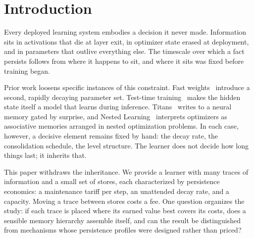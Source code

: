 \documentclass[11pt]{article}
\begin{document}
\section{Introduction}
\label{sec:intro}

Every deployed learning system embodies a decision it never made. Information sits in activations that
die at layer exit, in optimizer state erased at deployment, and in parameters that outlive everything
else. The timescale over which a fact persists follows from where it happens to sit, and where it sits
was fixed before training began.

Prior work loosens specific instances of this constraint. Fast weights~\citep{hinton1987fast,
ba2016using} introduce a second, rapidly decaying parameter set. Test-time training~\citep{sun2024testtime}
makes the hidden state itself a model that learns during inference. Titans~\citep{behrouz2024titans}
writes to a neural memory gated by surprise, and Nested Learning~\citep{behrouz2025nested} interprets
optimizers as associative memories arranged in nested optimization problems. In each case, however, a
decisive element remains fixed by hand: the decay rate, the consolidation schedule, the level
structure. The learner does not decide how long things last; it inherits that.

This paper withdraws the inheritance. We provide a learner with many traces of information and a small
set of stores, each characterized by persistence economics: a maintenance tariff per step, an
unattended decay rate, and a capacity. Moving a trace between stores costs a fee. One question
organizes the study: if each trace is placed where its earned value best covers its costs, does a
sensible memory hierarchy assemble itself, and can the result be distinguished from mechanisms whose
persistence profiles were designed rather than priced?
\end{document}
